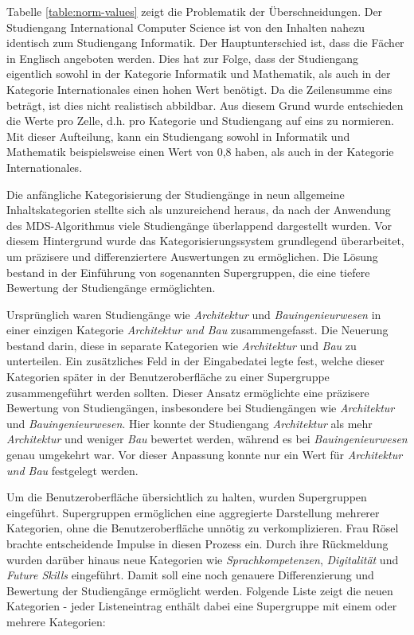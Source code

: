 Tabelle \ref{table:norm-values} zeigt die Problematik der Überschneidungen. Der
Studiengang International Computer Science ist von den Inhalten nahezu
identisch zum Studiengang Informatik. Der Hauptunterschied ist, dass die Fächer
in Englisch angeboten werden. Dies hat zur Folge, dass der Studiengang
eigentlich sowohl in der Kategorie Informatik und Mathematik, als auch in der
Kategorie Internationales einen hohen Wert benötigt. Da die Zeilensumme eins
beträgt, ist dies nicht realistisch abbildbar. Aus diesem Grund wurde
entschieden die Werte pro Zelle, d.h. pro Kategorie und Studiengang auf eins
zu normieren. Mit dieser Aufteilung, kann ein Studiengang sowohl in Informatik
und Mathematik beispielsweise einen Wert von 0,8 haben, als auch in der
Kategorie Internationales.

Die anfängliche Kategorisierung der Studiengänge in neun allgemeine Inhaltskategorien stellte sich als unzureichend heraus, da nach der Anwendung des MDS-Algorithmus viele Studiengänge überlappend dargestellt wurden. Vor diesem Hintergrund wurde das Kategorisierungssystem grundlegend überarbeitet, um präzisere und differenziertere Auswertungen zu ermöglichen. Die Lösung bestand in der Einführung von sogenannten Supergruppen, die eine tiefere Bewertung der Studiengänge ermöglichten.

Ursprünglich waren Studiengänge wie \textit{Architektur} und
\textit{Bauingenieurwesen} in einer einzigen Kategorie
\textit{Architektur und Bau} zusammengefasst. Die Neuerung bestand darin, diese
in separate Kategorien wie \textit{Architektur} und \textit{Bau} zu unterteilen.
Ein zusätzliches Feld in der Eingabedatei legte fest, welche dieser Kategorien
später in der Benutzeroberfläche zu einer Supergruppe zusammengeführt werden
sollten. Dieser Ansatz ermöglichte eine präzisere Bewertung von Studiengängen,
insbesondere bei Studiengängen wie \textit{Architektur} und
\textit{Bauingenieurwesen}. Hier konnte der Studiengang \textit{Architektur} als
mehr \textit{Architektur} und weniger \textit{Bau} bewertet werden, während es
bei \textit{Bauingenieurwesen} genau umgekehrt war. Vor dieser Anpassung konnte
nur ein Wert für \textit{Architektur und Bau} festgelegt werden.

Um die Benutzeroberfläche übersichtlich zu halten, wurden Supergruppen eingeführt. Supergruppen ermöglichen eine aggregierte Darstellung mehrerer Kategorien, ohne die Benutzeroberfläche unnötig zu verkomplizieren. Frau Rösel brachte entscheidende Impulse in diesen Prozess ein. Durch ihre Rückmeldung wurden darüber hinaus neue Kategorien wie \textit{Sprachkompetenzen}, \textit{Digitalität} und \textit{Future Skills} eingeführt. Damit soll eine noch genauere Differenzierung und Bewertung der Studiengänge ermöglicht werden. Folgende Liste zeigt die neuen Kategorien - jeder Listeneintrag enthält dabei eine Supergruppe mit einem oder mehrere Kategorien:


